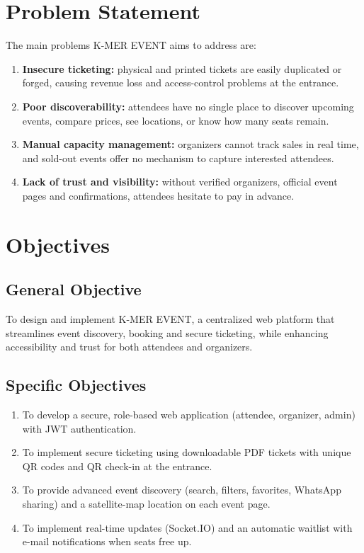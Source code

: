 \documentclass[12pt,a4paper]{report}
\begin{document}
\section{Problem Statement}
The main problems K-MER EVENT aims to address are:
\begin{enumerate}
  \item \textbf{Insecure ticketing:} physical and printed tickets are easily duplicated or
        forged, causing revenue loss and access-control problems at the entrance.
  \item \textbf{Poor discoverability:} attendees have no single place to discover upcoming
        events, compare prices, see locations, or know how many seats remain.
  \item \textbf{Manual capacity management:} organizers cannot track sales in real time, and
        sold-out events offer no mechanism to capture interested attendees.
  \item \textbf{Lack of trust and visibility:} without verified organizers, official event
        pages and confirmations, attendees hesitate to pay in advance.
\end{enumerate}

\section{Objectives}
\subsection{General Objective}
To design and implement K-MER EVENT, a centralized web platform that streamlines event
discovery, booking and secure ticketing, while enhancing accessibility and trust for both
attendees and organizers.

\subsection{Specific Objectives}
\begin{enumerate}
  \item To develop a secure, role-based web application (attendee, organizer, admin) with
        JWT authentication.
  \item To implement secure ticketing using downloadable PDF tickets with unique QR codes and
        QR check-in at the entrance.
  \item To provide advanced event discovery (search, filters, favorites, WhatsApp sharing)
        and a satellite-map location on each event page.
  \item To implement real-time updates (Socket.IO) and an automatic waitlist with e-mail
        notifications when seats free up.
\end{enumerate}
\end{document}
